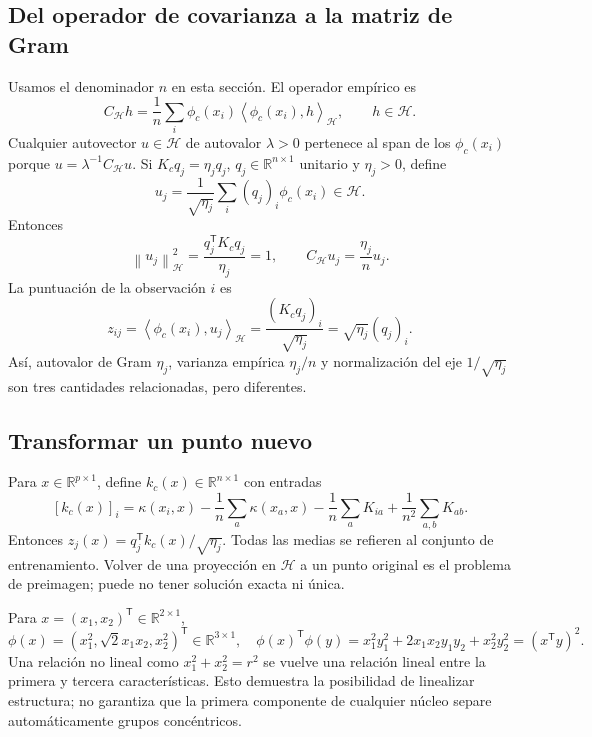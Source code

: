 \documentclass[11pt,a4paper]{article}
\newcommand{\R}{\mathbb R}
\newcommand{\T}{^{\mathsf T}}
\newcommand{\norm}[1]{\left\lVert #1\right\rVert}
\newcommand{\ip}[2]{\left\langle #1,#2\right\rangle}
\theoremstyle{definition}
\begin{document}
\subsection{Del operador de covarianza a la matriz de Gram}
Usamos el denominador $n$ en esta sección. El operador empírico es
\[
C_{\mathcal H}h=\frac1n\sum_i\phi_c(x_i)\ip{\phi_c(x_i)}h_{\mathcal H},\qquad h\in\mathcal H.
\]
Cualquier autovector $u\in\mathcal H$ de autovalor $\lambda>0$ pertenece al span de los $\phi_c(x_i)$ porque $u=\lambda^{-1}C_{\mathcal H}u$. Si $K_cq_j=\eta_jq_j$, $q_j\in\R^{n\times1}$ unitario y $\eta_j>0$, define
\[
u_j=\frac1{\sqrt{\eta_j}}\sum_i(q_j)_i\phi_c(x_i)\in\mathcal H.
\]
Entonces
\[
\norm{u_j}_{\mathcal H}^2=\frac{q_j\T K_cq_j}{\eta_j}=1,\qquad
C_{\mathcal H}u_j=\frac{\eta_j}{n}u_j.
\]
La puntuación de la observación $i$ es
\[
z_{ij}=\ip{\phi_c(x_i)}{u_j}_{\mathcal H}
=\frac{(K_cq_j)_i}{\sqrt{\eta_j}}=\sqrt{\eta_j}(q_j)_i.
\]
Así, autovalor de Gram $\eta_j$, varianza empírica $\eta_j/n$ y normalización del eje $1/\sqrt{\eta_j}$ son tres cantidades relacionadas, pero diferentes.
\subsection{Transformar un punto nuevo}
Para $x\in\R^{p\times1}$, define $k_c(x)\in\R^{n\times1}$ con entradas
\[
[k_c(x)]_i=\kappa(x_i,x)-\frac1n\sum_a\kappa(x_a,x)
-\frac1n\sum_aK_{ia}+\frac1{n^2}\sum_{a,b}K_{ab}.
\]
Entonces $z_j(x)=q_j\T k_c(x)/\sqrt{\eta_j}$. Todas las medias se refieren al conjunto de entrenamiento. Volver de una proyección en $\mathcal H$ a un punto original es el problema de preimagen; puede no tener solución exacta ni única.
\begin{ejemplo}
Para $x=(x_1,x_2)\T\in\R^{2\times1}$,
\[
\phi(x)=(x_1^2,\sqrt2x_1x_2,x_2^2)\T\in\R^{3\times1},\quad
\phi(x)\T\phi(y)=x_1^2y_1^2+2x_1x_2y_1y_2+x_2^2y_2^2=(x\T y)^2.
\]
Una relación no lineal como $x_1^2+x_2^2=r^2$ se vuelve una relación lineal entre la primera y tercera características. Esto demuestra la posibilidad de linealizar estructura; no garantiza que la primera componente de cualquier núcleo separe automáticamente grupos concéntricos.
\end{ejemplo}
\end{document}
